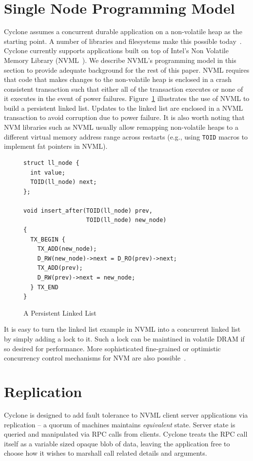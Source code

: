\documentclass[letterpaper,twocolumn,10pt]{article}
\begin{document}
\section{Single Node Programming Model}
Cyclone assumes a concurrent durable application on a non-volatile heap as the
starting point. A number of libraries and filesystems make this possible
today~\cite{nvml, dax, pmfs, mnemosyne, nvheaps, cdds}. Cyclone currently
supports applications built on top of Intel's Non Volatile Memory Library
(NVML~\cite{nvml}). We describe NVML's programming model in this section to
provide adequate background for the rest of this paper. NVML requires 
that code that makes changes to the non-volatile heap is enclosed in a crash
consistent transaction such that either all of the transaction executes or none
of it executes in the event of power failures.
Figure~\ref{fig:example} illustrates the use of NVML to build a persistent
linked list. Updates to the linked list are enclosed in a NVML transaction to
avoid corruption due to power failure. It is also worth noting that NVM
libraries such as NVML usually allow remapping non-volatile heaps to a different
virtual memory address range across restarts (e.g., using {\tt TOID} macros to
implement fat pointers in NVML).

\begin{figure}
  { \scriptsize
\begin{verbatim}
struct ll_node {
  int value;
  TOID(ll_node) next;
};

void insert_after(TOID(ll_node) prev, 
                  TOID(ll_node) new_node)
{
  TX_BEGIN {
    TX_ADD(new_node);
    D_RW(new_node)->next = D_RO(prev)->next;
    TX_ADD(prev);
    D_RW(prev)->next = new_node;
  } TX_END
}

\end{verbatim}
  }
\caption{A Persistent Linked List}
\label{fig:example}
\end{figure}

It is easy to turn the linked list example in NVML into a concurrent linked list
by simply adding a lock to it. Such a lock can be maintined in volatile DRAM if
so desired for performance. More sophisticated fine-grained or optimistic
concurrency control mechanisms for NVM are also
possible~\cite{mnemosyne, cdds, nvheaps}.

\section{Replication}
Cyclone is designed to add fault tolerance to NVML client server applications
via replication -- a quorum of machines maintains \emph{equivalent} state.
Server state is queried and manipulated via RPC calls from clients.  Cyclone
treats the RPC call itself as a variable sized opaque blob of data, leaving the
application free to choose how it wishes to marshall call related details and
arguments.
\end{document}
